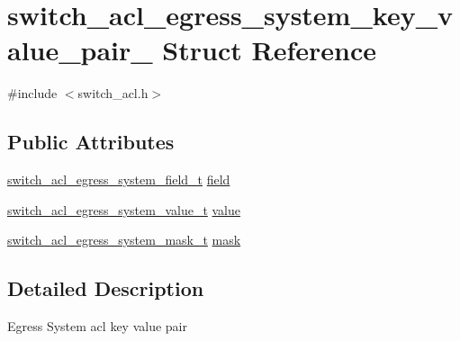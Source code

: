 \hypertarget{structswitch__acl__egress__system__key__value__pair__}{\section{switch\+\_\+acl\+\_\+egress\+\_\+system\+\_\+key\+\_\+value\+\_\+pair\+\_\+ Struct Reference}
\label{structswitch__acl__egress__system__key__value__pair__}
}


{\ttfamily \#include $<$switch\+\_\+acl.\+h$>$}

\subsection*{Public Attributes}
\begin{DoxyCompactItemize}
\item 
\hyperlink{group__ACL_gaa7bdcd874f436f3c04e22f49234d10a6}{switch\+\_\+acl\+\_\+egress\+\_\+system\+\_\+field\+\_\+t} \hyperlink{structswitch__acl__egress__system__key__value__pair___a534fb49cae3ab1d32956795cc256fa4f}{field}
\item 
\hyperlink{group__ACL_ga08645f3f0eeca88bbcdd1caa9732bb09}{switch\+\_\+acl\+\_\+egress\+\_\+system\+\_\+value\+\_\+t} \hyperlink{structswitch__acl__egress__system__key__value__pair___a07d0b9279e874685a96c950f7e65879f}{value}
\item 
\hyperlink{group__ACL_gab1587ad95d0aa8366975ee469308512f}{switch\+\_\+acl\+\_\+egress\+\_\+system\+\_\+mask\+\_\+t} \hyperlink{structswitch__acl__egress__system__key__value__pair___aef7495ee70d9c3ed29839f4ae5bc1654}{mask}
\end{DoxyCompactItemize}


\subsection{Detailed Description}
Egress System acl key value pair 

